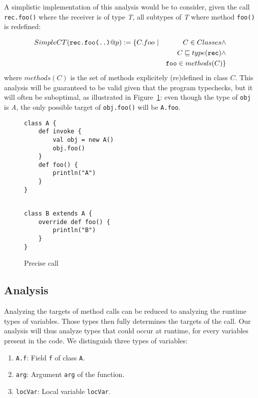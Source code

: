 A simplistic implementation of this analysis would be to consider, given
the call \verb/rec.foo()/ where the receiver is of type \emph{T}, all subtypes
of \emph{T} where method \verb/foo()/ is redefined:

\begin{eqnarray*}
        SimpleCT(\verb/rec.foo(..)/@p) := \{C.foo ~ &|& C \in Classes \land \\
        && C \subtypeeq type(\verb/rec/) \land \\
        && \verb/foo/ \in methods(C) \}
\end{eqnarray*}
where $methods(C)$ is the set of methods explicitely (re)defined in class $C$.
This analysis will be guaranteed to be valid given that the program typechecks,
but it will often be suboptimal, as illustrated in
Figure~\ref{fig:ta:example2}: even though the type of \verb/obj/ is \emph{A},
the only possible target of \verb/obj.foo()/ will be \verb/A.foo/.

\begin{figure}[h]
    \centering

\begin{minipage}[tl]{0.6\linewidth}
    \centering
\lstset{linewidth=0.6\linewidth}
\begin{lstlisting}
class A {
    def invoke {
        val obj = new A()
        obj.foo()
    }
    def foo() {
        println("A")
    }
}
\end{lstlisting}
\end{minipage}
\begin{minipage}[tl]{0.6\linewidth}
    \centering
\lstset{linewidth=0.6\linewidth}
\begin{lstlisting}

class B extends A {
    override def foo() {
        println("B")
    }
}
\end{lstlisting}
\end{minipage}
    \caption{Precise call}
    \label{fig:ta:example2}
\end{figure}

\subsection{Analysis}
Analyzing the targets of method calls can be reduced to analyzing the runtime
types of variables. Those types then fully determines the targets of the call.
Our analysis will thus analyze types that could occur at runtime, for every
variables present in the code. We distinguish three types of variables:
\begin{enumerate}
    \item \verb/A.f/: Field \verb/f/ of class \verb/A/.
    \item \verb/arg/: Argument \verb/arg/ of the function.
    \item \verb/locVar/: Local variable \verb/locVar/.
\end{enumerate}


